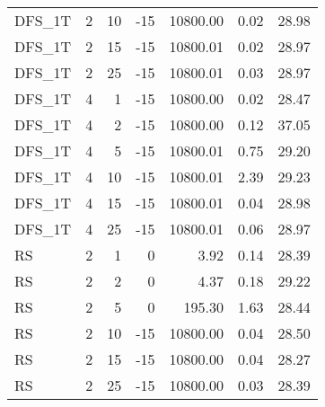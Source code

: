 \begin{center}
\begin{longtable}{lrrrrrr}
  DFS\_1T     & 2 & 10 & -15 & 10800.00 & 0.02 & 28.98 \\ 
  DFS\_1T     & 2 & 15 & -15 & 10800.01 & 0.02 & 28.97 \\ 
  DFS\_1T     & 2 & 25 & -15 & 10800.01 & 0.03 & 28.97 \\ 
  DFS\_1T     & 4 & 1 & -15 & 10800.00 & 0.02 & 28.47 \\ 
  DFS\_1T     & 4 & 2 & -15 & 10800.00 & 0.12 & 37.05 \\ 
  DFS\_1T     & 4 & 5 & -15 & 10800.01 & 0.75 & 29.20 \\ 
  DFS\_1T     & 4 & 10 & -15 & 10800.01 & 2.39 & 29.23 \\ 
  DFS\_1T     & 4 & 15 & -15 & 10800.01 & 0.04 & 28.98 \\ 
  DFS\_1T     & 4 & 25 & -15 & 10800.01 & 0.06 & 28.97 \\ 
  RS     & 2 & 1 &   0 & 3.92 & 0.14 & 28.39 \\ 
  RS     & 2 & 2 &   0 & 4.37 & 0.18 & 29.22 \\ 
  RS     & 2 & 5 &   0 & 195.30 & 1.63 & 28.44 \\ 
  RS     & 2 & 10 & -15 & 10800.00 & 0.04 & 28.50 \\ 
  RS     & 2 & 15 & -15 & 10800.00 & 0.04 & 28.27 \\ 
  RS     & 2 & 25 & -15 & 10800.00 & 0.03 & 28.39 \\ 

\end{longtable}
\end{center}
